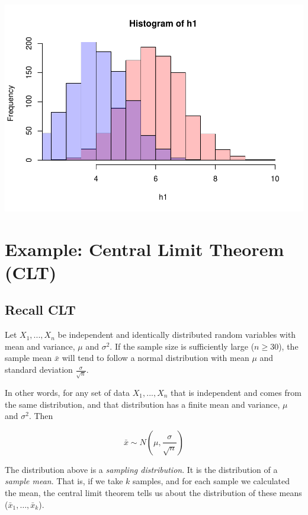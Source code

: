 \documentclass[
]{book}
\begin{document}
\includegraphics{_main_files/figure-latex/unnamed-chunk-228-1.pdf}

\hypertarget{example-central-limit-theorem-clt}{%
\section{Example: Central Limit Theorem (CLT)}\label{example-central-limit-theorem-clt}}

\hypertarget{recall-clt}{%
\subsection{Recall CLT}\label{recall-clt}}

Let \(X_1, ..., X_n\) be independent and identically distributed random variables with mean and variance, \(\mu\) and \(\sigma^2\). If the sample size is sufficiently large (\(n \geq 30\)), the sample mean \(\bar{x}\) will tend to follow a normal distribution with mean \(\mu\) and standard deviation \(\frac{\sigma}{\sqrt{n}}\).

In other words, for any set of data \(X_1, ..., X_n\) that is independent and comes from the same distribution, and that distribution has a finite mean and variance, \(\mu\) and \(\sigma^2\). Then

\[\bar{x} \sim N \left ( \mu, \frac{\sigma}{\sqrt{n}} \right ) \]

The distribution above is a \emph{sampling distribution}. It is the distribution of a \emph{sample mean}. That is, if we take \(k\) samples, and for each sample we calculated the mean, the central limit theorem tells us about the distribution of these means (\(\bar{x}_1, \dots, \bar{x}_k\)).
\end{document}
